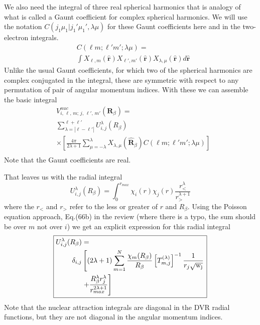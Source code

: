 \documentclass[%
pra%
,twocolumn%
,amssymb, nobibnotes, aps,
longbibliography
]{revtex4-1}
\begin{document}
We also need the integral of three real spherical harmonics
that is analogy of what is called a Gaunt coefficient for complex
spherical harmonics.  We will use the notation
$C(j_1\mu_1|j_1'\mu_1',\lambda \mu)$ for these  Gaunt coefficients 
here and in the two-electron integrals.
\begin{equation}
\begin{split}
& C(\ell m;\ell' m';\lambda \mu) = \\
& \int 
X_{\ell,m} (\mathbf{\hat{r}})
X_{\ell',m'} (\mathbf{\hat{r}})
X_{\lambda,\mu} (\mathbf{\hat{r}})
d\mathbf{\hat{r}} 
\end{split}
\end{equation}
Unlike the usual Gaunt coefficients, for which two of the spherical
harmonics are complex conjugated in the integral, these are symmetric
with respect to any permutation of pair of angular momentum indices.
With these we can assemble the basic integral
\begin{equation}
\boxed{
\begin{aligned}
& V^{nuc}_{i, \, \ell, \,m; \, j, \,\ell', \, m'}(\mathbf{R}_\beta) = \\
& \sum_{\lambda=|\ell-\ell'|}^{\ell+\ell'}
  U^\lambda_{i,j}(R_\beta) \\
& \times \left[
 \frac{4\pi} {2\lambda+1} 
\sum_{\mu=-\lambda}^{\lambda} X_{\lambda,\mu}(\mathbf{\hat{R}}_\beta)
C(\ell m;\ell' m';\lambda \mu)   \right] \\
\end{aligned}
}
\end{equation}
Note that the Gaunt coefficients are real.

That leaves us with the radial integral 
\begin{equation}
U^\lambda_{i,j}(R_\beta) = \int_0^{r_{max}} \chi_{i}(r) \chi_{j}(r) 
\frac{r_<^\lambda}{r_>^{\lambda+1}} 
\end{equation}
where the $r_<$ and $r_>$  refer to the less or greater of $r$ and $R_\beta$.
Using the Poisson equation approach, Eq.(66b) in the review \cite{TopicalReview2004}
(where there is a typo, the sum should be over $m$ not over $i$)
we get an explicit expression for this radial integral
\begin{equation}
\boxed{
\begin{aligned}
U^\lambda_{i,j}(R_\beta) & =  \\
\delta_{i,j}
& \left[
(2 \lambda +1) \sum_{m=1}^N 
\frac{\chi_m(R_\beta)}{R_\beta}
\left[ T^{(\lambda)}_{m,j}\right]^{-1} 
\frac{1}{r_{j}\sqrt{\rm{w}_{j}}} 
 \right. \\
& \left.  
 + \frac{R_\beta^{\lambda} r_{j}^\lambda }{r_{max}^{2\lambda+1}} 
\right]
\end{aligned}
}
\end{equation}
Note that the nuclear attraction integrals are diagonal in the 
DVR radial functions, but they are not diagonal in the angular momentum
indices.  
\end{document}
